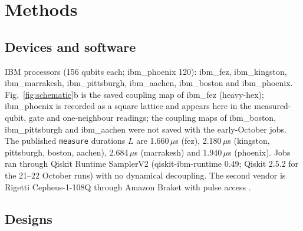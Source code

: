 \documentclass[reprint,amsmath,amssymb,aps,superscriptaddress,nofootinbib]{revtex4-2}
\newcommand{\us}{\,$\mu$s}
\begin{document}
\section{Methods}

\subsection{Devices and software}

IBM processors (156 qubits each; ibm\_phoenix 120): ibm\_fez, ibm\_kingston, ibm\_marrakesh, ibm\_pittsburgh, ibm\_aachen, ibm\_boston and ibm\_phoenix. Fig.~\ref{fig:schematic}b is the saved coupling map of ibm\_fez (heavy-hex); ibm\_phoenix is recorded as a square lattice and appears here in the measured-qubit, gate and one-neighbour readings; the coupling maps of ibm\_boston, ibm\_pittsburgh and ibm\_aachen were not saved with the early-October jobs. The published \texttt{measure} durations $L$ are 1.660\us{} (fez), 2.180\us{} (kingston, pittsburgh, boston, aachen), 2.684\us{} (marrakesh) and 1.940\us{} (phoenix). Jobs ran through Qiskit Runtime SamplerV2 (qiskit-ibm-runtime 0.49; Qiskit 2.5.2 for the 21--22 October runs) with no dynamical decoupling. The second vendor is Rigetti Cepheus-1-108Q through Amazon Braket with pulse access \cite{Karalekas2020}.

\subsection{Designs}
\end{document}

